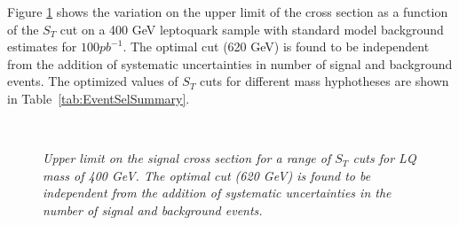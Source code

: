 Figure \ref{fig:optimization} shows the variation on the upper limit of the cross section as a function of 
the $S_T$ cut on a 400 GeV leptoquark sample with standard model background estimates for $100 pb^{-1}$.  
The optimal cut (620 GeV) is found to be independent from the addition 
of systematic uncertainties in number of signal and background events.
The optimized values of $S_{T}$ cuts for different mass hyphotheses are shown in Table~\ref{tab:EventSelSummary}. 
%
\begin{figure}[htbp]
  \begin{center}
       \\
    \caption{\small \sl Upper limit on the signal cross section for a range of $S_T$ cuts for LQ mass of 400 GeV. 
      The optimal cut (620 GeV) is found to be independent from the addition of systematic uncertainties in the 
      number of signal and background events.}
    \label{fig:optimization}
  \end{center}
\end{figure}
%

%
